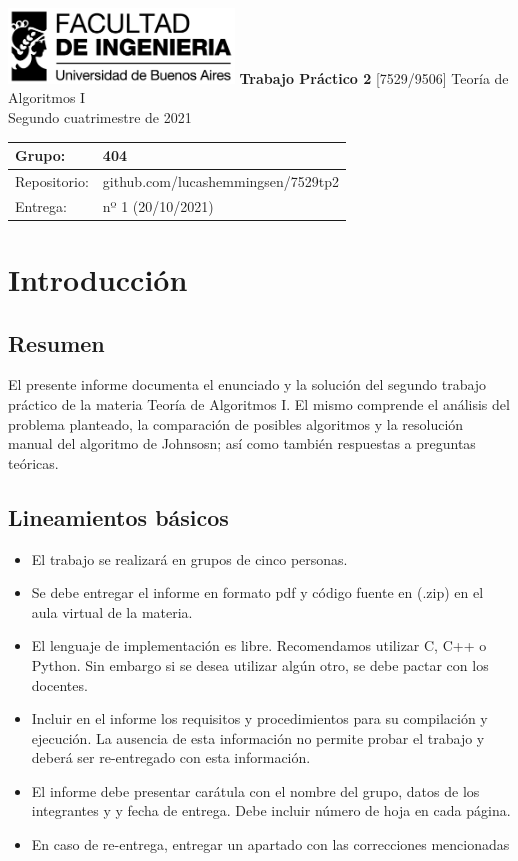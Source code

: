 \documentclass[titlepage,a4paper]{article}
\begin{document}
\begin{titlepage} %
	\hfill\includegraphics[width=6cm]{img/logofiuba.jpg}
    \centering
    \vfill
    \Huge \textbf{Trabajo Práctico 2}
    \vskip2cm
    \Large [7529/9506] Teoría de Algoritmos I\\
    Segundo cuatrimestre de 2021
    \vfill
    \begin{tabular}{ | l | l | } %
      \hline
      Grupo: & 404 \\ \hline
      Repositorio: & github.com/lucashemmingsen/7529tp2 \\ \hline
      Entrega: & nº 1 (20/10/2021) \\ \hline
  	\end{tabular}
    \vfill
    
    \vfill
\end{titlepage}

\tableofcontents %
\newpage

\section{Introducción}\label{sec:intro}
\subsection{Resumen}
El presente informe documenta el enunciado y la solución del segundo trabajo práctico
de la materia Teoría de Algoritmos I. El mismo comprende el análisis del problema
planteado, la comparación de posibles algoritmos y la resolución manual del algoritmo
de Johnsosn; así como también respuestas a preguntas teóricas.

\subsection{Lineamientos básicos}
\begin{itemize}
    \item El trabajo se realizará en grupos de cinco personas.
    \item Se debe entregar el informe en formato pdf y código fuente en (.zip) en el aula virtual de la materia.
    \item El lenguaje de implementación es libre. Recomendamos utilizar C, C++ o Python. Sin embargo si se desea utilizar algún otro, se debe pactar con los docentes.
    \item Incluir en el informe los requisitos y procedimientos para su compilación y ejecución. La ausencia de esta información no permite probar el trabajo y deberá ser re-entregado con esta información.
    \item El informe debe presentar carátula con el nombre del grupo, datos de los integrantes y y fecha de entrega. Debe incluir número de hoja en cada página.
    \item En caso de re-entrega, entregar un apartado con las correcciones mencionadas
\end{itemize}
\end{document}
